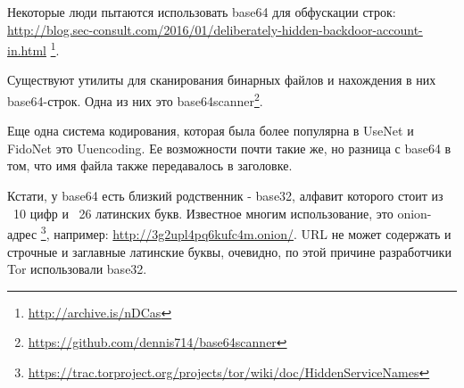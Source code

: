 Некоторые люди пытаются использовать base64 для обфускации строк:
\url{http://blog.sec-consult.com/2016/01/deliberately-hidden-backdoor-account-in.html}
\footnote{\url{http://archive.is/nDCas}}.

Существуют утилиты для сканирования бинарных файлов и нахождения в них base64-строк.
Одна из них это base64scanner\footnote{\url{https://github.com/dennis714/base64scanner}}.

Еще одна система кодирования, которая была более популярна в UseNet и FidoNet это Uuencoding.
Ее возможности почти такие же, но разница с base64 в том, что имя файла также передавалось в заголовке.

Кстати, у base64 есть близкий родственник - base32, алфавит которого стоит из ~10 цифр и ~26 латинских букв.
Известное многим использование, это onion-адрес
\footnote{\url{https://trac.torproject.org/projects/tor/wiki/doc/HiddenServiceNames}},
например: \url{http://3g2upl4pq6kufc4m.onion/}.
\ac{URL} не может содержать и строчные и заглавные латинские буквы, очевидно, по этой причине разработчики Tor
использовали base32.

